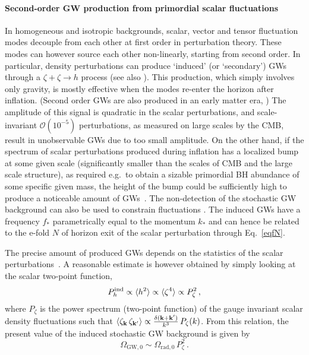 \documentclass[11pt,a4paper]{article}
\begin{document}
\paragraph{Second-order GW production from primordial scalar fluctuations}
In homogeneous and isotropic backgrounds, scalar, vector and tensor fluctuation modes decouple from each other at first order in perturbation theory. These modes can however source each other non-linearly, starting from second order. In particular, density perturbations can produce  `induced' (or `secondary') GWs through a $\zeta+\zeta \to h$ process \cite{Mollerach:2003nq,Ananda:2006af,Baumann:2007zm} (see also \cite{Kohri:2018awv,Espinosa:2018eve, Braglia:2020eai}). This production, which simply involves only gravity, is mostly effective when the modes re-enter the horizon after inflation. (Second order GWs are also produced in an early matter era, \cite{Inomata:2019ivs,Inomata:2019zqy})
The amplitude of this signal is quadratic in the scalar perturbations, and scale-invariant ${\mathcal{O}} \left( 10^{-5} \right)$  perturbations, as measured on large scales by the CMB, result in unobservable GWs due to too small amplitude. On the other hand, if the spectrum of scalar perturbations produced during inflation has a localized bump at some given scale (significantly smaller than the scales of CMB and the large scale structure), as required e.g.\ to obtain a sizable primordial BH abundance of some specific given mass, the height of the bump could be sufficiently high to produce a noticeable amount of GWs~\cite{Inomata:2016rbd,Garcia-Bellido:2017aan,Bartolo:2018rku}. The non-detection of the stochastic GW background can also be used to constrain fluctuations \cite{Byrnes:2018txb,Inomata:2018epa}. The induced GWs have a frequency $f_*$ parametrically equal to the momentum $k_*$ and can hence be related to the e-fold $N$ of horizon exit of the scalar perturbation through Eq.~\eqref{eqfN}.

The precise amount of produced GWs depends on the statistics of the scalar perturbations~\cite{Nakama:2016gzw,Garcia-Bellido:2017aan,Cai:2018dig,Unal:2018yaa}. A reasonable estimate is however obtained by simply looking at the scalar two-point function,
%
\begin{equation}
P_{h}^{\rm ind}  \propto \langle h^2 \rangle  \propto \langle \zeta^4 \rangle \propto P_\zeta^2 \,,
\end{equation}
%
where $P_\zeta$ is the power spectrum (two-point function) of the gauge invariant scalar density fluctuations such that $\langle \zeta_{\bf k} \, \zeta_{\bf k'} \rangle \propto  \frac{\delta ({\bf k+k'})}{k^3} \, P_\zeta (k)$. From this relation, the present value of the induced stochastic GW background is given by
%
\begin{equation}
\Omega_{\text{GW},0} \sim  \Omega_{\text{rad},0} \,  P_\zeta^2 \,.
\end{equation}
\end{document}
